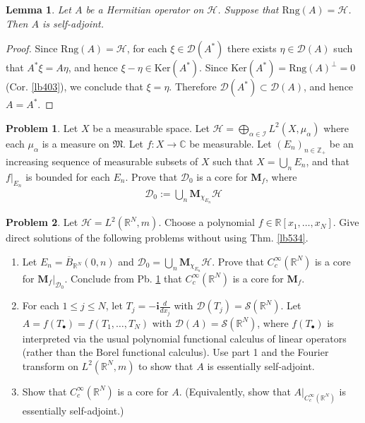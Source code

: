 \documentclass[12pt,b5paper,notitlepage]{article}
\theoremstyle{definition}
\newtheorem{prob}{\color{red}Problem}[section]
\theoremstyle{plain}
\newtheorem{lm}[df]{Lemma}
\newcommand{\fk}{\mathfrak}
\newcommand{\ovl}{\overline}
\newcommand{\Dom}{\mathscr{D}}
\newcommand{\im}{\mathbf{i}}
\newcommand{\blt}{\bullet}
\newcommand{\Cbb}{\mathbb C}
\newcommand{\Zbb}{\mathbb Z}
\newcommand{\Rbb}{\mathbb R}
\newcommand{\Ker}{\mathrm{Ker}}
\newcommand{\Rng}{\mathrm{Rng}}
\newcommand{\MH}{\mathcal H}
\newcommand{\MS}{\mathcal S}
\newcommand{\SI}{\mathscr I}
\newcommand{\Mbf}{\mathbf M}
\numberwithin{equation}{section}
\begin{document}
\begin{lm}\label{lb486}
Let $A$ be a Hermitian operator on $\MH$. Suppose that $\Rng(A)=\MH$. Then $A$ is self-adjoint.
\end{lm}


\begin{proof}
Since $\Rng(A)=\MH$, for each $\xi\in\Dom(A^*)$ there exists $\eta\in\Dom(A)$ such that $A^*\xi=A\eta$, and hence $\xi-\eta\in\Ker(A^*)$. Since $\Ker(A^*)=\Rng(A)^\perp=0$ (Cor. \ref{lb403}), we conclude that $\xi=\eta$. Therefore $\Dom(A^*)\subset\Dom(A)$, and hence $A=A^*$.
\end{proof}


\begin{prob}\label{lb538}
Let $X$ be a measurable space.  Let $\MH=\bigoplus_{\alpha\in\SI}L^2(X,\mu_\alpha)$ where each $\mu_\alpha$ is a measure on $\fk M$. Let $f:X\rightarrow\Cbb$ be measurable. Let $(E_n)_{n\in\Zbb_+}$ be an increasing sequence of measurable subsets of $X$ such that $X=\bigcup_n E_n$, and that $f|_{E_n}$ is bounded for each $E_n$. Prove that $\Dom_0$ is a core for $\Mbf_f$, where
\begin{align*}
\Dom_0:=\bigcup_n \Mbf_{\chi_{E_n}}\MH
\end{align*}
\end{prob}

\begin{prob}\label{lb539}
Let $\MH=L^2(\Rbb^N,m)$. Choose a polynomial $f\in\Rbb[x_1,\dots,x_N]$. Give direct solutions of the following problems without using Thm. \ref{lb534}.
\begin{enumerate}
\item Let $E_n=\ovl B_{\Rbb^N}(0,n)$ and $\Dom_0=\bigcup_n\Mbf_{\chi_{E_n}}\MH$. Prove that $C_c^\infty(\Rbb^N)$ is a core for $\Mbf_f|_{\Dom_0}$. Conclude from Pb. \ref{lb538} that $C_c^\infty(\Rbb^N)$ is a core for $\Mbf_f$.
\item For each $1\leq j\leq N$, let $T_j=-\im\frac d{dx_j}$ with $\Dom(T_j)=\MS(\Rbb^N)$. Let $A=f(T_\blt)=f(T_1,\dots,T_N)$ with $\Dom(A)=\MS(\Rbb^N)$, where $f(T_\blt)$ is interpreted via the usual polynomial functional calculus of linear operators (rather than the Borel functional calculus). Use part 1 and the Fourier transform on $L^2(\Rbb^N,m)$ to show that $A$ is essentially self-adjoint. 
\item Show that $C_c^\infty(\Rbb^N)$ is a core for $A$. (Equivalently, show that $A|_{C_c^\infty(\Rbb^N)}$ is essentially self-adjoint.)
\end{enumerate}
\end{prob}
\end{document}

